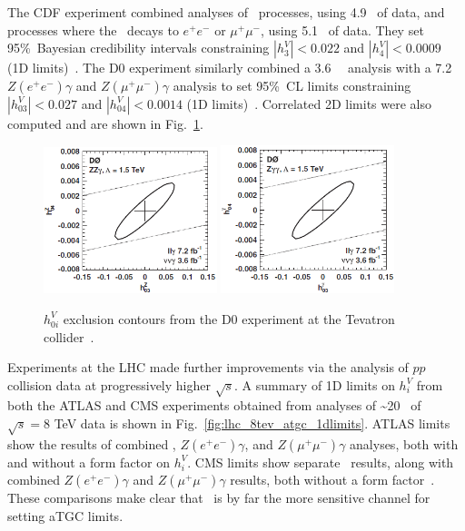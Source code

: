 \documentclass[oneside, letterpaper, 12pt, oldfontcommands]{memoir}
\begin{document}
The CDF experiment combined analyses of \zinvg\ processes, using 4.9 \fbinv\ of data, and processes where the \PZ\ decays to
$e^\mathrm{+}e^\mathrm{-}$ or $\mu^\mathrm{+}\mu^\mathrm{-}$, using 5.1 \fbinv\ of data.
They set 95\%\ Bayesian credibility intervals constraining $|h_{3}^{V}| < 0.022$ and $|h_{4}^{V}| < 0.0009$ (1D limits)~\cite{ref:PhysRevLett.107.051802}.
The D0 experiment similarly combined a 3.6 \fbinv\ \zinvg\ analysis with a 7.2
\fbinv\ $Z(e^\mathrm{+}e^\mathrm{-})\gamma$ and $Z(\mu^\mathrm{+}\mu^\mathrm{-})\gamma$ analysis to set 95\%\ CL limits constraining
$|h_{03}^{V}| < 0.027$ and $|h_{04}^{V}| < 0.0014$ (1D limits)~\cite{ref:PhysRevD.85.052001}. Correlated 2D limits were also
computed and are shown in Fig.~\ref{fig:d0_aTGC}.

\begin{figure}[hbtp]
  \begin{center}
    \includegraphics[width=0.45\textwidth]{Figures/d0_ZZg.png}
    \includegraphics[width=0.45\textwidth]{Figures/d0_Zgg.png}
    \caption{
      $h_{0i}^{V}$ exclusion contours from the D0 experiment at the Tevatron collider~\cite{ref:PhysRevD.85.052001}.
    }
    \label{fig:d0_aTGC}
  \end{center}
\end{figure}

Experiments at the LHC made further improvements via the analysis of $pp$ collision data at progressively higher $\sqrt{s}$.
A summary of 1D limits on $h_{i}^{V}$ from both the ATLAS and CMS experiments obtained from analyses of \textasciitilde20 \fbinv\ of $\sqrt{s} = 8$ TeV data
is shown in Fig.~\ref{fig:lhc_8tev_atgc_1dlimits}. ATLAS limits show the results
of combined \zinvg, $Z(e^\mathrm{+}e^\mathrm{-})\gamma$, and $Z(\mu^\mathrm{+}\mu^\mathrm{-})\gamma$
analyses, both with and without a form factor on $h_{i}^{V}$. CMS limits show separate \zinvg\ results,
along with combined $Z(e^\mathrm{+}e^\mathrm{-})\gamma$ and $Z(\mu^\mathrm{+}\mu^\mathrm{-})\gamma$
results, both without a form factor~\cite{ref:RevModPhys.89.035008}. These comparisons make clear that \zinvg\ is by far
the more sensitive channel for setting aTGC limits.
\end{document}
